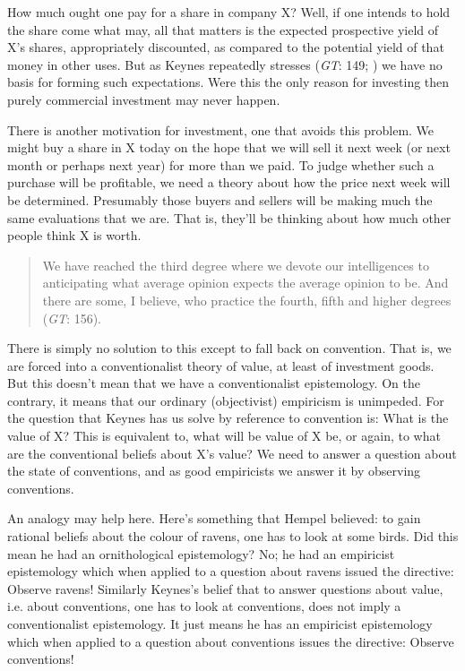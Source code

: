 How much ought one pay for a share in company X? Well, if one intends to hold the share come what may, all that matters is the expected prospective yield of X's shares, appropriately discounted, as compared to the potential yield of that money in other uses. But as Keynes repeatedly stresses (\textit{GT}: 149; \cite[114]{Keynes1937}) we have no basis for forming such expectations. Were this the only reason for investing then purely commercial investment may never happen.

There is another motivation for investment, one that avoids this problem. We might buy a share in X today on the hope that we will sell it next week (or next month or perhaps next year) for more than we paid. To judge whether such a purchase will be profitable, we need a theory about how the price next week will be determined. Presumably those buyers and sellers will be making much the same evaluations that we are. That is, they'll be thinking about how much other people think X is worth. 

\begin{quote}
We have reached the third degree where we devote our intelligences to anticipating what average opinion expects the average opinion to be. And there are some, I believe, who practice the fourth, fifth and higher degrees (\textit{GT}: 156).
\end{quote}

\noindent There is simply no solution to this except to fall back on convention. That is, we are forced into a conventionalist theory of value, at least of investment goods. But this doesn't mean that we have a conventionalist epistemology. On the contrary, it means that our ordinary (objectivist) empiricism is unimpeded. For the question that Keynes has us solve by reference to convention is: What is the value of X? This is equivalent to, what will be value of X be, or again, to what are the conventional beliefs about X's value? We need to answer a question about the state of conventions, and as good empiricists we answer it by observing conventions.

An analogy may help here. Here's something that Hempel believed: to gain rational beliefs about the colour of ravens, one has to look at some birds. Did this mean he had an ornithological epistemology? No; he had an empiricist epistemology which when applied to a question about ravens issued the directive: Observe ravens! Similarly Keynes's belief that to answer questions about value, i.e. about conventions, one has to look at conventions, does not imply a conventionalist epistemology. It just means he has an empiricist epistemology which when applied to a question about conventions issues the directive: Observe conventions!

